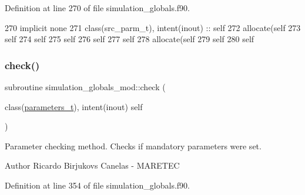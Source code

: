 Definition at line 270 of file simulation\+\_\+globals.\+f90.


\begin{DoxyCode}
270     \textcolor{keywordtype}{implicit none}
271     \textcolor{keywordtype}{class}(src\_parm\_t), \textcolor{keywordtype}{intent(inout)} :: self
272     \textcolor{keyword}{allocate}(self%
273     self%
274     self%
275     self%
276     self%
277     self%
278     \textcolor{keyword}{allocate}(self%
279     self%
280     self%
\end{DoxyCode}
\mbox{\label{namespacesimulation__globals__mod_a41249abb5c33ef9e8bff448f0b3826fa}} 
\subsubsection{\texorpdfstring{check()}{check()}}
{\footnotesize\ttfamily subroutine simulation\+\_\+globals\+\_\+mod\+::check (\begin{DoxyParamCaption}\item[{class(\mbox{\hyperlink{structsimulation__globals__mod_1_1parameters__t}{parameters\+\_\+t}}), intent(inout)}]{self }\end{DoxyParamCaption})\hspace{0.3cm}{\ttfamily [private]}}



Parameter checking method. Checks if mandatory parameters were set. 

\begin{DoxyAuthor}{Author}
Ricardo Birjukovs Canelas -\/ M\+A\+R\+E\+T\+EC 
\end{DoxyAuthor}


Definition at line 354 of file simulation\+\_\+globals.\+f90.


